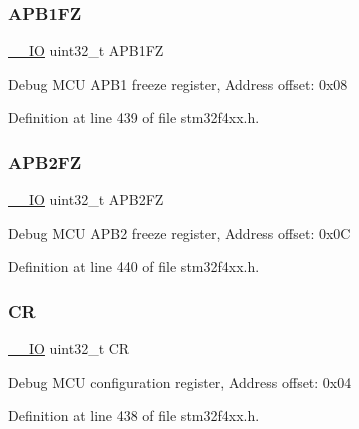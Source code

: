 \subsubsection{\texorpdfstring{A\+P\+B1\+FZ}{APB1FZ}}
{\footnotesize\ttfamily \hyperlink{group___c_m_s_i_s__core__definitions_gaec43007d9998a0a0e01faede4133d6be}{\+\_\+\+\_\+\+IO} uint32\+\_\+t A\+P\+B1\+FZ}

Debug M\+CU A\+P\+B1 freeze register, Address offset\+: 0x08 

Definition at line 439 of file stm32f4xx.\+h.

\mbox{\label{struct_d_b_g_m_c_u___type_def_a4628a8c32f97ef93b15b2b503ef90c75}} 
\subsubsection{\texorpdfstring{A\+P\+B2\+FZ}{APB2FZ}}
{\footnotesize\ttfamily \hyperlink{group___c_m_s_i_s__core__definitions_gaec43007d9998a0a0e01faede4133d6be}{\+\_\+\+\_\+\+IO} uint32\+\_\+t A\+P\+B2\+FZ}

Debug M\+CU A\+P\+B2 freeze register, Address offset\+: 0x0C 

Definition at line 440 of file stm32f4xx.\+h.

\mbox{\label{struct_d_b_g_m_c_u___type_def_ab40c89c59391aaa9d9a8ec011dd0907a}} 
\subsubsection{\texorpdfstring{CR}{CR}}
{\footnotesize\ttfamily \hyperlink{group___c_m_s_i_s__core__definitions_gaec43007d9998a0a0e01faede4133d6be}{\+\_\+\+\_\+\+IO} uint32\+\_\+t CR}

Debug M\+CU configuration register, Address offset\+: 0x04 

Definition at line 438 of file stm32f4xx.\+h.

\mbox{\label{struct_d_b_g_m_c_u___type_def_a24df28d0e440321b21f6f07b3bb93dea}} 
